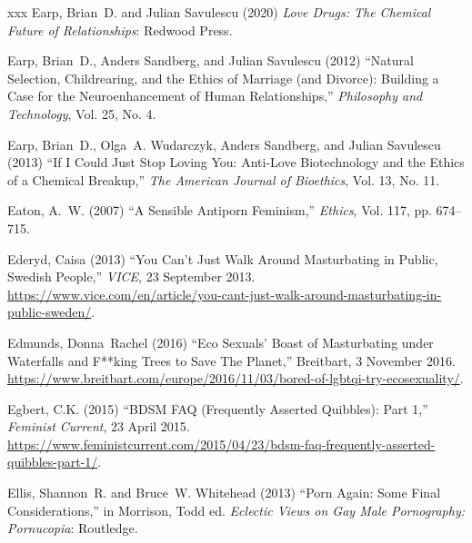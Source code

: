 \documentclass[]{jlreq} \usepackage{mystyle}
\begin{document}
\begin{thebibliography}{xxx}
Earp, Brian~D. and Julian Savulescu (2020)  \textit{ Love Drugs: The Chemical
  Future of Relationships}: Redwood Press.

Earp, Brian~D., Anders Sandberg, and Julian Savulescu (2012) ``Natural
  Selection, Childrearing, and the Ethics of Marriage (and Divorce): Building a
  Case for the Neuroenhancement of Human Relationships,'' \textit{ Philosophy
  and Technology}, Vol. 25, No. 4.

Earp, Brian~D., Olga~A. Wudarczyk, Anders Sandberg, and Julian Savulescu (2013)
  ``If I Could Just Stop Loving You: Anti-Love Biotechnology and the Ethics of
  a Chemical Breakup,'' \textit{ The American Journal of Bioethics}, Vol. 13,
  No. 11.

Eaton, A.~W. (2007) ``A Sensible Antiporn Feminism,'' \textit{ Ethics}, Vol.
  117, pp. 674--715.

Ederyd, Caisa (2013) ``You Can't Just Walk Around Masturbating in Public,
  Swedish People,'' \emph{VICE}, 23 September 2013.
  \url{https://www.vice.com/en/article/you-cant-just-walk-around-masturbating-in-public-sweden/}.

Edmunds, Donna~Rachel (2016) ``Eco Sexuals' Boast of Masturbating under
  Waterfalls and F**king Trees to Save The Planet,'' Breitbart, 3 November
  2016.
  \url{https://www.breitbart.com/europe/2016/11/03/bored-of-lgbtqi-try-ecosexuality/}.

Egbert, C.K. (2015) ``BDSM FAQ (Frequently Asserted Quibbles): Part 1,''
  \emph{Feminist Current}, 23 April 2015.
  \url{https://www.feministcurrent.com/2015/04/23/bdsm-faq-frequently-asserted-quibbles-part-1/}.

Ellis, Shannon~R. and Bruce~W. Whitehead (2013) ``Porn Again: Some Final
  Considerations,'' in Morrison, Todd ed.   \textit{ Eclectic Views on Gay Male
  Pornography: Pornucopia}: Routledge.


\end{thebibliography}
\end{document}
